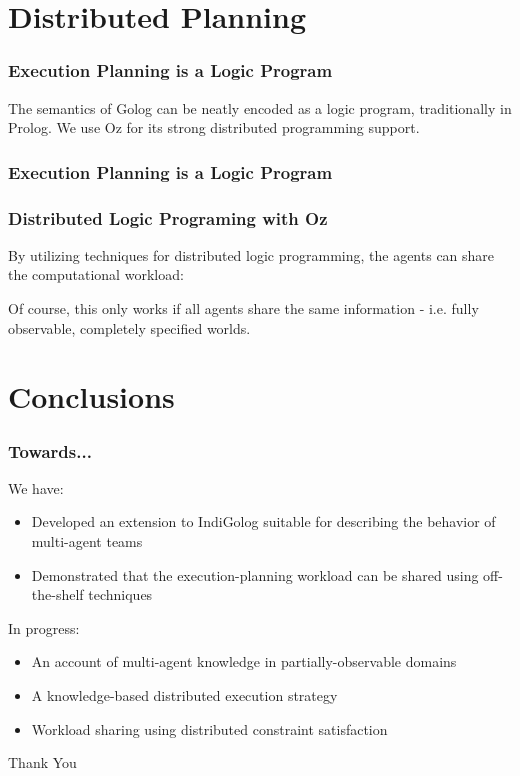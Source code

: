 \documentclass[compress]{beamer}
\begin{document}
\section{Distributed Planning}

\begin{frame}
\frametitle{Execution Planning is a Logic Program}
The semantics of Golog can be neatly encoded as a logic program,
traditionally in Prolog.  We use Oz for its strong distributed programming
support.

{\small  }{\small \par}

\end{frame}

\begin{frame}
\frametitle{Execution Planning is a Logic Program}

{\small  }{\small \par}

\end{frame}

\begin{frame}
\frametitle{Distributed Logic Programing with Oz}
By utilizing techniques for distributed logic programming, the agents
can share the computational workload:

\centering {\small  }{\small \par}

Of course, this only works if all agents share the same information - 
i.e. fully observable, completely specified worlds.
\end{frame}

\section{Conclusions}

\begin{frame}
\frametitle{Towards...}
We have:
\begin{itemize}
  \item Developed an extension to IndiGolog suitable for describing the behavior of multi-agent teams
  \item Demonstrated that the execution-planning workload can be shared using off-the-shelf techniques
\end{itemize}

In progress:
\begin{itemize}
  \item An account of multi-agent knowledge in partially-observable domains
  \item A knowledge-based distributed execution strategy
  \item Workload sharing using distributed constraint satisfaction
\end{itemize}
\end{frame}

\begin{frame}
\centering \large Thank You\\
\end{frame}
\end{document}
